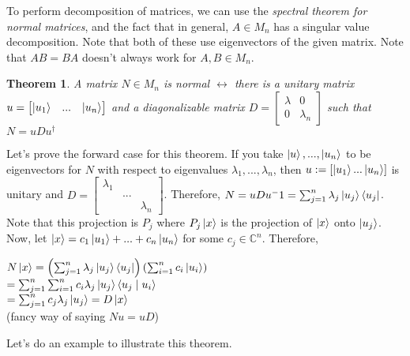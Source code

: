 \documentclass[12pt]{article}
\theoremstyle{plain}
\newtheorem{theorem}[lemma]{Theorem}
\theoremstyle{nonumberplain}
\theoremstyle{plain}
\theoremstyle{nonumberplain}
\newcommand\1{{\bf 1}}
\newcommand{\bmat}[1]{\begin{bmatrix*} #1 \end{bmatrix*}} %
\newcommand{\C}{\mathbb{C}} %
\newcommand{\<}{\left\langle}
\renewcommand{\>}{\right\rangle}
\newcommand{\inp}[2]{\left\langle#1\mid #2\right\rangle} %
\begin{document}
To perform decomposition of matrices, we can use the \textit{spectral theorem for normal matrices}, and the fact that in general, $A\in M_n$ has a singular value decomposition. Note that both of these use eigenvectors of the given matrix. Note that $AB=BA$ doesn't always work for $A,B\in M_n$.
\begin{theorem}\label{thm:stfnm}
A matrix $N\in M_n$ is normal $\longleftrightarrow$ there is a unitary matrix $u=\bmat{\ket{u_1} & ... & \ket{u_n}}$ and a diagonalizable matrix $D=\bmat{\lambda & 0 \\ 0 & \lambda_n}$ such that $N=uDu^\dagger$
\end{theorem}
Let's prove the forward case for this theorem. If you take $\ket{u},...,\ket{u_n}$ to be eigenvectors for $N$ with respect to eigenvalues $\lambda_1,...,\lambda_n$, then $u:=\left[ \ket{u_1} ... \ket{u_n}\right]$ is unitary and $D=\bmat{\lambda_1 & & \\ & ... & \\ & & \lambda_n}$. Therefore, $N=uDu^-1=\sum^n_{j=1}\lambda_j\ket{u_j}\bra{u_j}$. Note that this projection is $P_j$ where $P_j\ket{x}$ is the projection of $\ket{x}$ onto $\ket{u_j}$. Now, let $\ket{x}=c_1\ket{u_1}+...+c_n\ket{u_n}$ for some $c_j\in\C^n$. Therefore, 
\begin{center}
$N\ket{x}=\left(\sum^n_{j=1}\lambda_j\ket{u_j}\bra{u_j}\right)\left(\sum^n_{i=1}c_i\ket{u_i}\right)$ \\
$=\sum^n_{j=1} \sum^n_{i=1} c_i \lambda_j \ket{u_j} \inp{u_j}{u_i}$ \\
$=\sum^n_{j=1}c_j \lambda_j \ket{u_j}=D \ket{x}$ \\
(fancy way of saying $Nu=uD$)
\end{center}
Let's do an example to illustrate this theorem.
\end{document}
